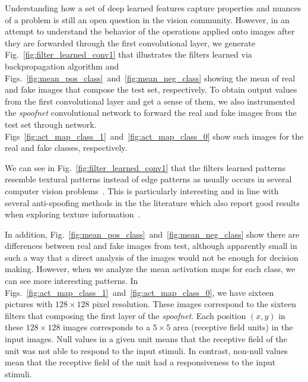 %
Understanding how a set of deep learned features capture properties and nuances of a problem is still an open question in the vision community. However, in an attempt to understand the behavior of the operations applied onto images after they are forwarded through the first convolutional layer, we generate Fig.~\ref{fig:filter_learned_conv1} that illustrates the filters learned via backpropagation algorithm and Figs.~\ref{fig:mean_pos_class}~and~\ref{fig:mean_neg_class} showing the mean of real and fake images that compose the test set, respectively. To obtain output values from the first convolutional layer and get a sense of them, we also instrumented the \textit{spoofnet} convolutional network to forward the real and fake images from the test set through network. Figs~\ref{fig:act_map_class_1}~and~\ref{fig:act_map_class_0} show such images for the real and fake classes, respectively.

We can see in Fig.~\ref{fig:filter_learned_conv1} that the filters learned patterns resemble textural patterns instead of edge patterns as usually occurs in several computer vision problems~\cite{Krizhevsky:2012,Ouyang:2014}. This is particularly interesting and in line with several anti-spoofing methods in the the literature which also report good results when exploring texture information~\cite{Ghiani:ICB:2013, Maatta:IJCB:2011}.

In addition, Fig.~\ref{fig:mean_pos_class}~and~\ref{fig:mean_neg_class} show there are differences between real and fake images from test, although apparently small in such a way that a direct analysis of the images would not be enough for decision making. However, when we analyze the mean activation maps for each class, we can see more interesting patterns. In Figs.~\ref{fig:act_map_class_1}~and~\ref{fig:act_map_class_0}, we have sixteen pictures with $128 \times 128$ pixel resolution. These images correspond to the sixteen filters that composing the first layer of the \textit{spoofnet}. Each position $(x,y)$ in these $128 \times 128$ images corresponds to a $5 \times 5$ area (receptive field units) in the input images. Null values in a given unit means that the receptive field of the unit was not able to respond to the input stimuli. In contrast, non-null values mean that the receptive field of the unit had a responsiveness to the input stimuli.

